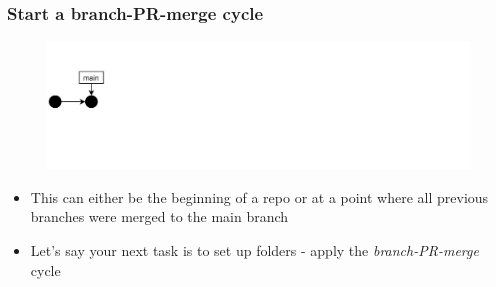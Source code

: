 \documentclass[aspectratio=169]{beamer} %
\begin{document}
\begin{frame}
	\frametitle{Start a branch-PR-merge cycle}

	\vspace{-.5cm}
	\begin{minipage}[t][5cm][t]{\textwidth}
		\begin{figure}
			\centering
			\includegraphics[width=\textwidth]{./img/dime-gitflow-network-0.png}
		\end{figure}
	\end{minipage}

	\vspace{-.5cm}
	\begin{minipage}[t][5cm][t]{\textwidth}
		\begin{itemize}
			\setlength\itemsep{.5em}
			\item This can either be the beginning of a repo
			or at a point where all previous branches were merged
			to the main branch
			\item Let's say your next task is to set up folders
			- apply the \textit{branch-PR-merge} cycle
		\end{itemize}
	\end{minipage}

\end{frame}
\end{document}
